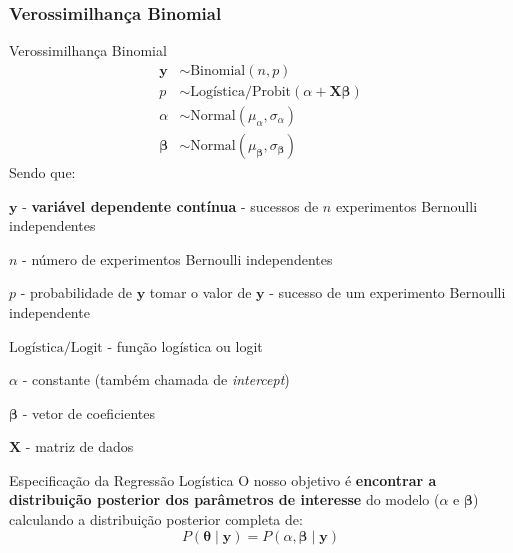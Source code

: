 \subsubsection{Verossimilhança Binomial}
\begin{frame}{Verossimilhança Binomial}
    \small
    $$
    \begin{aligned}
        \boldsymbol{y} &\sim \text{Binomial}\left(n,  p\right) \\
        p &\sim \text{Logística/Probit}(\alpha +  \mathbf{X} \boldsymbol{\beta}) \\
        \alpha &\sim \text{Normal}(\mu_\alpha, \sigma_\alpha) \\
        \boldsymbol{\beta} &\sim \text{Normal}(\mu_{\boldsymbol{\beta}}, \sigma_{\boldsymbol{\beta}})
    \end{aligned}
    $$
    Sendo que:
    \begin{vfilleditems}
        \item \small $\boldsymbol{y}$ - \textbf{variável dependente contínua} - sucessos de $n$ experimentos Bernoulli independentes
        \item \small $n$ - número de experimentos Bernoulli independentes
        \item \small $p$ - probabilidade de $\boldsymbol{y}$ tomar o valor de $\boldsymbol{y}$ - sucesso de um experimento Bernoulli independente
        \item \small $\text{Logística/Logit}$ - função logística ou logit
        \item \small $\alpha$ - constante (também chamada de \textit{intercept})
        \item \small $\boldsymbol{\beta}$ - vetor de coeficientes
        \item \small $\mathbf{X}$ - matriz de dados
    \end{vfilleditems}
\end{frame}

\begin{frame}{Especificação da Regressão Logística}
    O nosso objetivo é \textbf{encontrar a distribuição posterior dos parâmetros de
    interesse} do modelo ($\alpha$ e $\boldsymbol{\beta}$) calculando a distribuição
    posterior completa de:
    $$
    P(\boldsymbol{\theta} \mid \boldsymbol{y}) = P(\alpha, \boldsymbol{\beta} \mid \boldsymbol{y})
    $$
\end{frame}

